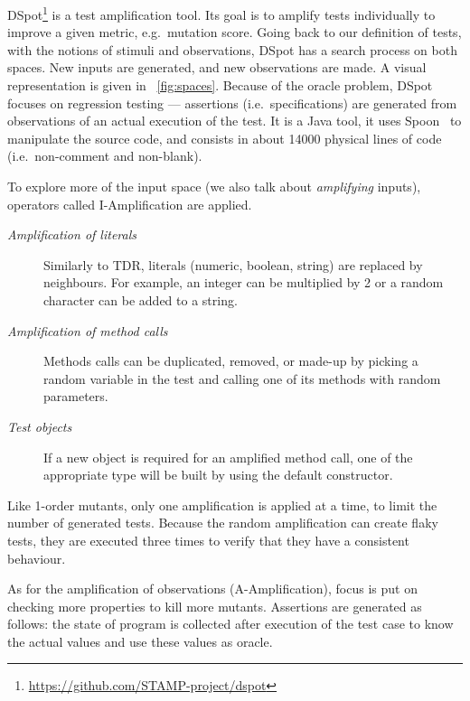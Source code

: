 \documentclass[a4paper,11pt]{sdm_internship}
\newcommand{\addref}[1]{\colorbox{TealBlue!100}{\textcolor{white}{\textbf{$[$\ifx&#1&\ \else#1\fi$]$}}}}
\newcommand{\dspot}{DSpot\xspace}
\theoremstyle{definition}
\begin{document}
\dspot{}\footnote{\url{https://github.com/STAMP-project/dspot}}\cite{baudry2015automatic,baudry2014tailored,baudry2015dspot} is a test amplification tool.
Its goal is to amplify tests individually to improve a given metric, e.g.\ mutation score.
Going back to our definition of tests, with the notions of stimuli and observations, \dspot{} has a search process on both spaces.
New inputs are generated, and new observations are made.
A visual representation is given in \figurename~\ref{fig:spaces}.
Because of the oracle problem, \dspot{} focuses on regression testing --- assertions (i.e.\ specifications) are generated from observations of an actual execution of the test.
It is a Java tool, it uses Spoon~\cite{pawlak2016spoon} to manipulate the source code, and consists in about 14000 physical lines of code (i.e.\ non-comment and non-blank).

To explore more of the input space (we also talk about \emph{amplifying} inputs), operators called I-Amplification are applied.
\begin{description}
  \item[\textit{Amplification of literals}] Similarly to TDR, literals (numeric, boolean, string) are replaced by neighbours. For example, an integer can be multiplied by 2 or a random character can be added to a string.
  \item[\textit{Amplification of method calls}] Methods calls can be duplicated, removed, or made-up by picking a random variable in the test and calling one of its methods with random parameters.
  \item[\textit{Test objects}] If a new object is required for an amplified method call, one of the appropriate type will be built by using the default constructor.
\end{description}
Like 1-order mutants, only one amplification is applied at a time, to limit the number of generated tests.
Because the random amplification can create flaky tests, they are executed three times to verify that they have a consistent behaviour.

As for the amplification of observations (A-Amplification), focus is put on checking more properties to kill more mutants.
Assertions are generated as follows: the state of program is collected after execution of the test case to know the actual values and use these values as oracle.
\end{document}
